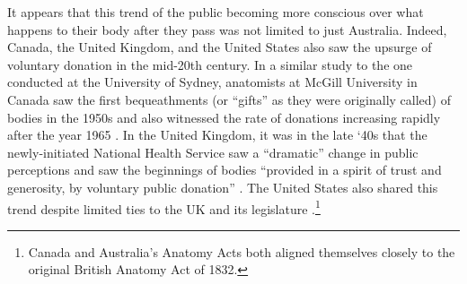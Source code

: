 It appears that this trend of the public becoming more conscious over what happens to their body after they pass was not limited to just Australia. Indeed, Canada, the United Kingdom, and the United States also saw the upsurge of voluntary donation in the mid-20th century. In a similar study to the one conducted at the University of Sydney, anatomists at McGill University in Canada saw the first bequeathments (or ``gifts'' as they were originally called) of bodies in the 1950s and also witnessed the rate of donations increasing rapidly after the year 1965 \parencite{noel_2022_mcgill}. In the United Kingdom, it was in the late `40s that the newly-initiated National Health Service saw a ``dramatic'' change in public perceptions and saw the beginnings of bodies ``provided in a spirit of trust and generosity, by voluntary public donation'' \parencite{richardson_2006_ukdonors, jones_1991_nzdonors}. The United States also shared this trend despite limited ties to the UK and its legislature \parencite{garment_2007_usadonors}.\footnote{Canada and Australia's Anatomy Acts both aligned themselves closely to the original British Anatomy Act of 1832.} 

